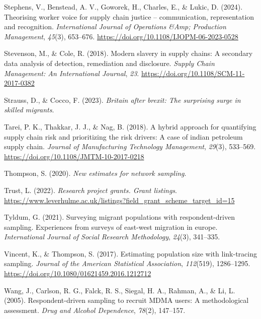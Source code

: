 \documentclass[
  12pt,
]{article}
\newlength{\cslhangindent}
\newenvironment{CSLReferences}[2] %
 {\begin{list}{}{%
  \setlength{\itemindent}{0pt}
  \setlength{\leftmargin}{0pt}
  \setlength{\parsep}{0pt}
  \ifodd #1
   \setlength{\leftmargin}{\cslhangindent}
   \setlength{\itemindent}{-1\cslhangindent}
  \fi
  \setlength{\itemsep}{#2\baselineskip}}}
 {\end{list}}
\theoremstyle{plain}
\theoremstyle{definition}
\begin{document}
\begin{CSLReferences}{1}{0}
Stephens, V., Benstead, A. V., Goworek, H., Charles, E., \& Lukic, D.
(2024). Theorising worker voice for supply chain justice --
communication, representation and recognition. \emph{International
Journal of Operations \&Amp; Production Management}, \emph{45}(3),
653--676. \url{https://doi.org/10.1108/IJOPM-06-2023-0528}

Stevenson, M., \& Cole, R. (2018). Modern slavery in supply chains: A
secondary data analysis of detection, remediation and disclosure.
\emph{Supply Chain Management: An International Journal}, \emph{23}.
\url{https://doi.org/10.1108/SCM-11-2017-0382}

Strauss, D., \& Cocco, F. (2023). \emph{Britain after brexit: The
surprising surge in skilled migrants}.

Tarei, P. K., Thakkar, J. J., \& Nag, B. (2018). A hybrid approach for
quantifying supply chain risk and prioritizing the risk drivers: A case
of indian petroleum supply chain. \emph{Journal of Manufacturing
Technology Management}, \emph{29}(3), 533--569.
\url{https://doi.org/10.1108/JMTM-10-2017-0218}

Thompson, S. (2020). \emph{New estimates for network sampling}.

Trust, L. (2022). \emph{Research project grants. Grant listings}.
\url{https://www.leverhulme.ac.uk/listings?field_grant_scheme_target_id=15}

Tyldum, G. (2021). Surveying migrant populations with respondent-driven
sampling. Experiences from surveys of east-west migration in europe.
\emph{International Journal of Social Research Methodology},
\emph{24}(3), 341--335.

Vincent, K., \& Thompson, S. (2017). Estimating population size with
link-tracing sampling. \emph{Journal of the American Statistical
Association}, \emph{112}(519), 1286--1295.
\url{https://doi.org/10.1080/01621459.2016.1212712}

Wang, J., Carlson, R. G., Falck, R. S., Siegal, H. A., Rahman, A., \&
Li, L. (2005). Respondent-driven sampling to recruit {MDMA} users: A
methodological assessment. \emph{Drug and Alcohol Dependence},
\emph{78}(2), 147--157.


\end{CSLReferences}
\end{document}
